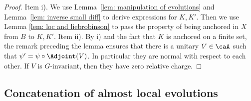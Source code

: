 \begin{proof}
	Item i).  We use Lemma~\ref{lem: manipulation of evolutions} and Lemma~\ref{lem: inverse small diff} to derive expressions for $K,K'$. Then we use Lemma \ref{lem: loc and liebrobinson} to pass the property of being anchored in $X$ from $B$ to $K,K'$. 
	Item ii). By i) and the fact that $K$ is anchored on a finite set, the remark preceding the lemma ensures that there is a unitary $V\in\caA$ such that $\psi'=\psi\circ\Adjoint(V)$. In particular they are normal with respect to each other. If $V$ is $G$-invariant, then they have zero relative charge.    
\end{proof}



\subsection{Concatenation of almost local evolutions}\label{sec:Concatenation of evolutions}

